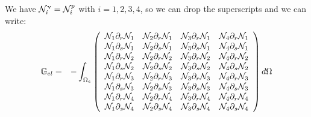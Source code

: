 We have $\bN_i^\upnu = \bN_i^p $ with $i=1,2,3,4$, so we can drop the superscripts and we can write:
\begin{eqnarray}
\G_{el} 
&=&
-\int_{\Omega_e}
\left(
\begin{array}{cccc}
\bN_1\partial_r \bN_1 & \bN_2\partial_r \bN_1 & \bN_3\partial_r \bN_1 & \bN_4\partial_r \bN_1 \\
\bN_1\partial_s \bN_1 & \bN_2\partial_s \bN_1 & \bN_3\partial_s \bN_1 & \bN_4\partial_s \bN_1 \\
\bN_1\partial_r \bN_2 & \bN_2\partial_r \bN_2 & \bN_3\partial_r \bN_2 & \bN_4\partial_r \bN_2 \\
\bN_1\partial_s \bN_2 & \bN_2\partial_s \bN_2 & \bN_3\partial_s \bN_2 & \bN_4\partial_s \bN_2 \\
\bN_1\partial_r \bN_3 & \bN_2\partial_r \bN_3 & \bN_3\partial_r \bN_3 & \bN_4\partial_r \bN_3 \\
\bN_1\partial_s \bN_3 & \bN_2\partial_s \bN_3 & \bN_3\partial_s \bN_3 & \bN_4\partial_s \bN_3 \\
\bN_1\partial_r \bN_4 & \bN_2\partial_r \bN_4 & \bN_3\partial_r \bN_4 & \bN_4\partial_r \bN_4 \\
\bN_1\partial_s \bN_4 & \bN_2\partial_s \bN_4 & \bN_3\partial_s \bN_4 & \bN_4\partial_s \bN_4 
\end{array}
\right)
d\Omega 
\end{eqnarray}


